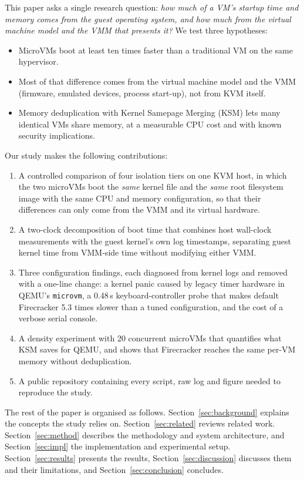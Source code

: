 \documentclass[pdflatex,sn-mathphys-num]{sn-jnl}%
\begin{document}
This paper asks a single research question: \emph{how much of a VM's startup time and memory comes from the guest operating system, and how much from the virtual machine model and the VMM that presents it?} We test three hypotheses:
\begin{itemize}
\item[\textbf{H1}] MicroVMs boot at least ten times faster than a traditional VM on the same hypervisor.
\item[\textbf{H2}] Most of that difference comes from the virtual machine model and the VMM (firmware, emulated devices, process start-up), not from KVM itself.
\item[\textbf{H3}] Memory deduplication with Kernel Samepage Merging (KSM) lets many identical VMs share memory, at a measurable CPU cost and with known security implications.
\end{itemize}

Our study makes the following contributions:
\begin{enumerate}
\item A controlled comparison of four isolation tiers on one KVM host, in which the two microVMs boot the \emph{same} kernel file and the \emph{same} root filesystem image with the same CPU and memory configuration, so that their differences can only come from the VMM and its virtual hardware.
\item A two-clock decomposition of boot time that combines host wall-clock measurements with the guest kernel's own log timestamps, separating guest kernel time from VMM-side time without modifying either VMM.
\item Three configuration findings, each diagnosed from kernel logs and removed with a one-line change: a kernel panic caused by legacy timer hardware in QEMU's \texttt{microvm}, a 0.48\,s keyboard-controller probe that makes default Firecracker 5.3 times slower than a tuned configuration, and the cost of a verbose serial console.
\item A density experiment with 20 concurrent microVMs that quantifies what KSM saves for QEMU, and shows that Firecracker reaches the same per-VM memory without deduplication.
\item A public repository containing every script, raw log and figure needed to reproduce the study.
\end{enumerate}

The rest of the paper is organised as follows. Section~\ref{sec:background} explains the concepts the study relies on. Section~\ref{sec:related} reviews related work. Section~\ref{sec:method} describes the methodology and system architecture, and Section~\ref{sec:impl} the implementation and experimental setup. Section~\ref{sec:results} presents the results, Section~\ref{sec:discussion} discusses them and their limitations, and Section~\ref{sec:conclusion} concludes.
\end{document}
